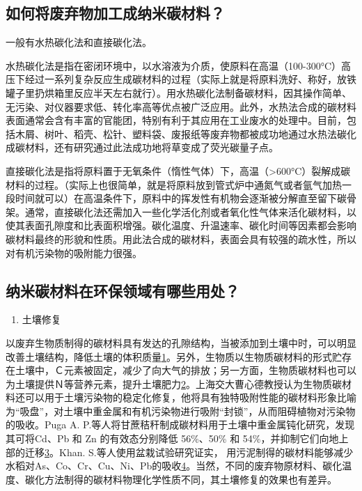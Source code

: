 \documentclass[]{book}
\providecommand{\tightlist}{%
  \setlength{\itemsep}{0pt}\setlength{\parskip}{0pt}}
\begin{document}
\subsection{如何将废弃物加工成纳米碳材料？}

一般有水热碳化法和直接碳化法。

水热碳化法是指在密闭环境中，以水溶液为介质，使原料在高温（100-300°C）高压下经过一系列复杂反应生成碳材料的过程（实际上就是将原料洗好、称好，放铁罐子里扔烘箱里反应半天左右就行）。用水热碳化法制备碳材料，因其操作简单、无污染、对仪器要求低、转化率高等优点被广泛应用。此外，水热法合成的碳材料表面通常会含有丰富的官能团，特别有利于其应用在工业废水的处理中。目前，包括木屑、树叶、稻壳、松针、塑料袋、废报纸等废弃物都被成功地通过水热法碳化成碳材料，还有研究通过此法成功地将草变成了荧光碳量子点。

直接碳化法是指将原料置于无氧条件（惰性气体）下，高温（\textgreater{}600°C）裂解成碳材料的过程。（实际上也很简单，就是将原料放到管式炉中通氮气或者氩气加热一段时间就可以）在高温条件下，原料中的挥发性有机物会逐渐被分解直至留下碳骨架。通常，直接碳化法还需加入一些化学活化剂或者氧化性气体来活化碳材料，以使其表面孔隙度和比表面积增强。碳化温度、升温速率、碳化时间等因素都会影响碳材料最终的形貌和性质。用此法合成的碳材料，表面会具有较强的疏水性，所以对有机污染物的吸附能力很强。

\subsection{纳米碳材料在环保领域有哪些用处？}

\begin{enumerate}
\def\labelenumi{\arabic{enumi}.}
\tightlist
\item
  土壤修复
\end{enumerate}

以废弃生物质制得的碳材料具有发达的孔隙结构，当被添加到土壤中时，可以明显改善土壤结构，降低土壤的体积质量\href{陈心想，耿增超。西北农林科技大学学报（自然科学版），2013，41:\%20167-174．}{1}。另外，生物质以生物质碳材料的形式贮存在土壤中，Ｃ元素被固定，减少了向大气的排放；另一方面，生物质碳材料也可以为土壤提供Ｎ等营养元素，提升土壤肥力\href{Kezhen\%20Qian,\%20Ajay\%20Kumar,\%20et.al.\%20Renew.\%20and\%20Sustain.\%20Energy\%20Reviews,\%202015,\%2042:\%201055-1064.}{2}。上海交大曹心德教授认为生物质碳材料还可以用于土壤污染物的稳定化修复，他将具有独特吸附性能的碳材料形象比喻为``吸盘''，对土壤中重金属和有机污染物进行吸附``封锁''，从而阻碍植物对污染物的吸收。Puga
A. P.等人将甘蔗秸秆制成碳材料用于土壤中重金属钝化研究，发现其可将Cd、Pb
和 Zn 的有效态分别降低 56\%、50\% 和
54\%，并抑制它们向地上部的迁移\href{Puga\%20A\%20P,\%20Abreu\%20C\%20A,\%20et\%20al.\%20J.\%20of\%20Environ.\%20Manage.,\%202015,\%20159:\%2086–93.}{3}。Khan.
S.等人使用盆栽试验研究证实，
用污泥制得的碳材料能够减少水稻对As、Co、Cr、Cu、Ni、Pb的吸收\href{Khan\%20S,\%20Cai\%20Chao,\%20et\%20al．\%20Environ.\%20Sci.\%20\&\%20Technol.,\%202013,\%2047\%20:\%208624-8632．}{4}。当然，不同的废弃物原材料、碳化温度、碳化方法制得的碳材料物理化学性质不同，其土壤修复的效果也有差异。
\end{document}
